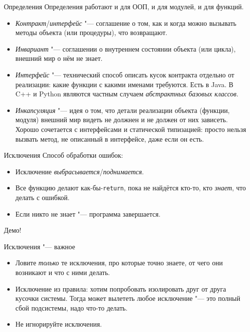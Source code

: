 \begin{frame}[t]{Определения}
Определения работают и для ООП, и для модулей, и для функций.

\begin{itemize}
\item
	\textit{Контракт}/\textit{интерфейс} "--- соглашение о том, как
	и когда можно вызывать методы объекта (или процедуры), что возвращают.
\item
	\textit{Инвариант} "--- соглашении о внутреннем состоянии объекта
	(или цикла), внешний мир о нём не знает.
\item
	\textit{Интерфейс} "--- технический способ описать кусок контракта
	отдельно от реализации: какие функции с какими именами требуются.
	Есть в Java.
	В C++ и Python являются частным случаем \textit{абстрактных базовых классов}.
\item
	\textit{Инкапсуляция} "--- идея о том, что детали реализации объекта
	(функции, модуля) внешний мир видеть не должнен и не должен от них
	зависеть.
	Хорошо сочетается с интерфейсами и статической типизацией:
	просто нельзя вызвать метод, не описанный в интерфейсе, даже если он есть.
\end{itemize}
\end{frame}

\begin{frame}[t]{Исключения}
Способ обработки ошибок:
\begin{itemize}
\item Исключение \textit{выбрасывается}/\textit{поднимается}.
\item Все функцию делают как-бы-\texttt{return}, пока не найдётся кто-то,
	кто \textit{знает}, что делать с ошибкой.
\item Если никто не знает "--- программа завершается.
\end{itemize}

Демо!
\end{frame}

\begin{frame}[t]{Исключения "--- важное}
\begin{itemize}
\item Ловите \textit{только} те исключения, про которые точно знаете,
	от чего они возникают и что с ними делать.
\item Исключение из правила: хотим попробовать изолировать друг от друга
	кусочки системы.
	Тогда может вылететь любое исключение "--- это полный сбой подсистемы,
	надо что-то делать.
\item Не игнорируйте исключения.
\end{itemize}
\end{frame}

